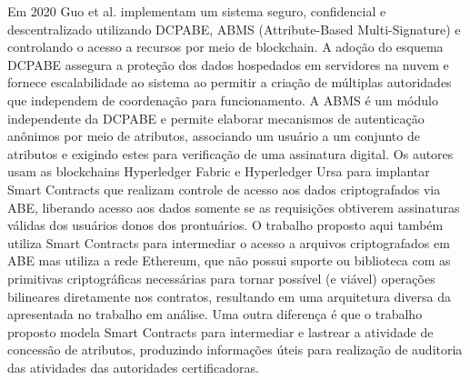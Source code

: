 \documentclass[a4paper,11pt]{article}
\begin{document}
Em 2020 Guo et al. \cite{Guo2020} implementam um sistema seguro, confidencial e descentralizado utilizando DCPABE, ABMS (Attribute-Based Multi-Signature) e controlando o acesso a recursos por meio de blockchain.
A adoção do esquema DCPABE assegura a proteção dos dados hospedados em servidores na nuvem e fornece escalabilidade ao sistema ao permitir a criação de múltiplas autoridades que independem de coordenação para funcionamento.
A ABMS é um módulo independente da DCPABE e permite elaborar mecanismos de autenticação anônimos por meio de atributos, associando um usuário a um conjunto de atributos e exigindo estes para verificação de uma assinatura digital.
Os autores usam as blockchains Hyperledger Fabric e Hyperledger Ursa para implantar Smart Contracts que realizam controle de acesso aos dados criptografados via ABE, liberando acesso aos dados somente se as requisições obtiverem assinaturas válidas dos usuários donos dos prontuários.
O trabalho proposto aqui também utiliza Smart Contracts para intermediar o acesso a arquivos criptografados em ABE mas utiliza a rede Ethereum, que não possui suporte ou biblioteca com as primitivas criptográficas necessárias para tornar possível (e viável) operações bilineares diretamente nos contratos, resultando em uma arquitetura diversa da apresentada no trabalho em análise.
Uma outra diferença é que o trabalho proposto modela Smart Contracts para intermediar e lastrear a atividade de concessão de atributos, produzindo informações úteis para realização de auditoria das atividades das autoridades certificadoras.
\end{document}
